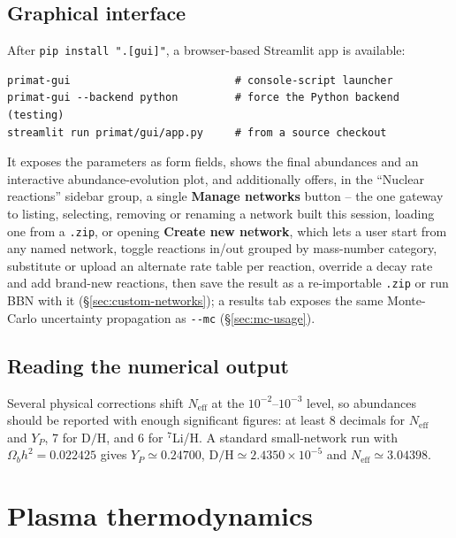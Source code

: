 \documentclass[11pt,a4paper]{article}
\newcommand{\Neff}{N_{\mathrm{eff}}}
\newcommand{\YP}{Y_P}
\newcommand{\DoH}{\mathrm{D/H}}
\newcommand{\code}[1]{\texttt{#1}}
\begin{document}
\subsection{Graphical interface}
After \code{pip install ".[gui]"}, a browser-based Streamlit app is available:
\begin{lstlisting}[style=sh]
primat-gui                          # console-script launcher
primat-gui --backend python         # force the Python backend (testing)
streamlit run primat/gui/app.py     # from a source checkout
\end{lstlisting}
It exposes the parameters as form fields, shows the final abundances and an
interactive abundance-evolution plot, and additionally offers, in the
``Nuclear reactions'' sidebar group, a single \textbf{Manage networks} button
-- the one gateway to listing, selecting, removing or renaming a network built
this session, loading one from a \code{.zip}, or opening \textbf{Create new
network}, which lets a user start from any named network, toggle reactions
in/out grouped by mass-number category, substitute or upload an alternate rate
table per reaction, override a decay rate and add brand-new reactions, then
save the result as a re-importable \code{.zip} or run BBN with it
(\S\ref{sec:custom-networks}); a results tab exposes the
same Monte-Carlo uncertainty propagation as \code{-{}-mc}
(\S\ref{sec:mc-usage}).

\subsection{Reading the numerical output}
Several physical corrections shift $\Neff$ at the $10^{-2}$--$10^{-3}$ level, so
abundances should be reported with enough significant figures: at least 8
decimals for $\Neff$ and $\YP$, 7 for $\DoH$, and 6 for $^{7}$Li/H. A standard
small-network run with $\Omega_b h^2 = 0.022425$ gives $\YP \simeq 0.24700$,
$\DoH \simeq 2.4350\times10^{-5}$ and $\Neff \simeq 3.04398$.

\section{Plasma thermodynamics}\label{sec:plasma}
\end{document}
